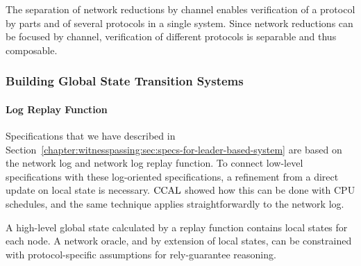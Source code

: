 The separation of network reductions by channel enables verification of a
protocol by parts and of several protocols in a single system. Since network
reductions can be focused by channel, verification of different protocols is
separable and thus composable.


\subsubsection{Building Global State Transition Systems}

\paragraph{Log Replay Function}
Specifications that we have described in
 Section~\ref{chapter:witnesspassing:sec:specs-for-leader-based-system}
 are based on the network log and network
log replay function. To connect low-level specifications with these log-oriented
specifications, a refinement from a direct update on local state is necessary. 
 $\mathrm{CCAL}$  showed how this can
be done with CPU schedules, and the same technique applies straightforwardly to
the network log.

A high-level global state calculated by a replay function contains local
states for each node. A network oracle, and by extension of local states, can
be constrained with protocol-specific assumptions for rely-guarantee reasoning.

